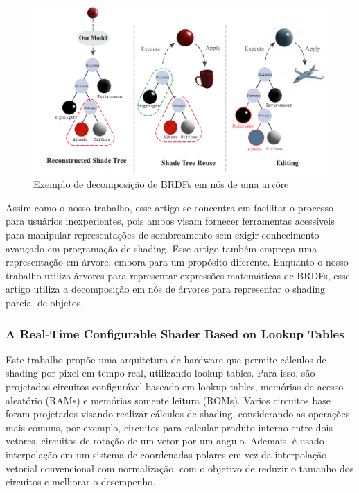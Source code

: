 \documentclass[english, 
               brazil, 
               bsc] %
               {dcomp-abntex2}
\begin{document}
\begin{figure}[H]
	\caption{\label{fig_grafico} Exemplo de decomposição de BRDFs em nós de uma arvóre}
	\begin{center}
	    \includegraphics[scale=0.5]{./Imagens/tree-shading.png}
	\end{center}
\end{figure}


Assim como o nosso trabalho, esse artigo se concentra em facilitar o processo para usuários inexperientes, pois ambos visam fornecer ferramentas acessíveis para manipular representações de sombreamento sem exigir conhecimento avançado em programação de shading. Esse artigo também emprega uma representação em árvore, embora para um propósito diferente. Enquanto o nosso trabalho utiliza árvores para representar expressões matemáticas de BRDFs, esse artigo utiliza a decomposição em nós de árvores para representar o shading parcial de objetos.

\subsubsection{A Real-Time Configurable Shader Based on Lookup Tables}



Este trabalho propõe uma arquitetura de hardware que permite cálculos de shading por pixel em tempo real, utilizando lookup-tables. Para isso, são projetados circuitos configurável baseado em lookup-tables, memórias de acesso aleatório (RAMs) e memórias somente leitura (ROMs). Varios circuitos base foram projetados visando realizar cálculos de shading, considerando as operações mais comuns, por exemplo, circuitos para calcular produto interno entre dois vetores, circuitos de rotação de um vetor por um angulo. Ademais, é usado interpolação em um sistema de coordenadas polares em vez da interpolação vetorial convencional com normalização, com o objetivo de reduzir o tamanho dos circuitos e melhorar o desempenho.
\end{document}
